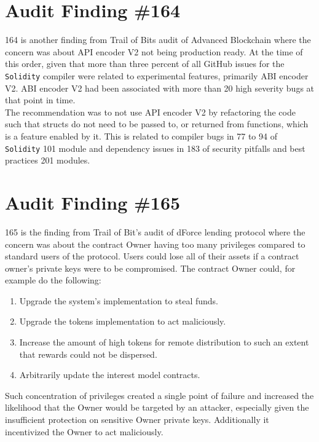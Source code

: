 \section{Audit Finding \#164}

164 is another finding from Trail of Bits audit of Advanced Blockchain where the concern was about API encoder V2 not being production ready. At the time of this order, given that more than three percent of all GitHub issues for the \verb|Solidity| compiler were related to experimental features, primarily ABI encoder V2. ABI encoder V2 had been associated with more than 20 high severity bugs at that point in time.\\

The recommendation was to not use API encoder V2 by refactoring the code such that structs do not need to be passed to, or returned from functions, which is a feature enabled by it. This is related to compiler bugs in 77 to 94 of \verb|Solidity| 101 module and dependency issues in 183 of security pitfalls and best practices 201 modules.

\section{Audit Finding \#165}

165 is the finding from Trail of Bit's audit of dForce lending protocol where the concern was about the contract Owner having too many privileges compared to standard users of the protocol. Users could lose all of their assets if a contract owner's private keys were to be compromised. The contract Owner could, for example do the following:
    \begin{enumerate}
    \item Upgrade the system's implementation to steal funds.
    \item Upgrade the tokens implementation to act maliciously.
    \item Increase the amount of high tokens for remote distribution to such an extent that rewards could not be dispersed.
    \item Arbitrarily update the interest model contracts.
    \end{enumerate}
    
Such concentration of privileges created a single point of failure and increased the likelihood that the Owner would be targeted by an attacker, especially given the insufficient protection on sensitive Owner private keys. Additionally it incentivized the Owner to act maliciously.\\

